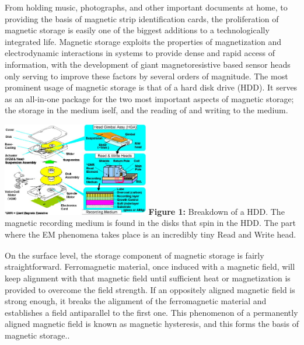 \documentclass[11pt]{article}
\begin{document}
\begin{multicols}{2} %
From holding music, photographs, and other important documents at home, to providing the basis of magnetic strip identification cards, the proliferation of magnetic storage is easily one of the biggest additions to a technologically integrated life. Magnetic storage exploits the properties of magnetization and electrodynamic interactions in systems to provide dense and rapid access of information, with the development of giant magnetoresistive based sensor heads only serving to improve these factors by several orders of magnitude. The most prominent usage of magnetic storage is that of a hard disk drive (HDD). It serves as an all-in-one package for the two most important aspects of magnetic storage; the storage in the medium iself, and the reading of and writing to the medium.
\begin{center}
	\centering
	\includegraphics[width=0.48\textwidth]{HDD_makeup.png}
	{\footnotesize\textbf{Figure 1:} Breakdown of a HDD. The magnetic recording medium is found in the disks that spin in the HDD. The part where the EM phenomena takes place is an incredibly tiny Read and Write head\textsubscript{\cite{label6}}.}
\end{center} 

On the surface level, the storage component of magnetic storage is fairly straightforward. Ferromagnetic material, once induced with a magnetic field, will keep alignment with that magnetic field until sufficient heat or magnetization is provided to overcome the field strength. If an oppositely aligned magnetic field is strong enough, it breaks the alignment of the ferromagnetic material and establishes a field antiparallel to the first one. This phenomenon of a permanently aligned magnetic field is known as magnetic hysteresis, and this forms the basis of magnetic storage.\textsubscript{\cite{label1}}.




\end{multicols}
\end{document}
